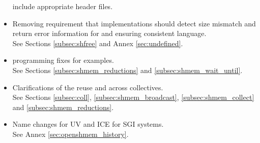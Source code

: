 \begin{itemize}
include appropriate header files.
%
\item Removing requirement that implementations should detect size mismatch and
return error information for  and ensuring consistent
language.
\\See Sections \ref{subsec:shfree} and Annex \ref{sec:undefined}.
%
\item \Fortran programming fixes for examples.\\ See Sections
\ref{subsec:shmem_reductions} and \ref{subsec:shmem_wait_until}.
%
\item Clarifications of the reuse  and  across
collectives.
\\See Sections \ref{subsec:coll}, \ref{subsec:shmem_broadcast},
      \ref{subsec:shmem_collect} and \ref{subsec:shmem_reductions}.
%
\item Name changes for UV and ICE for \ac{SGI} systems.
\\See Annex \ref{sec:openshmem_history}.
%
\end{itemize}


